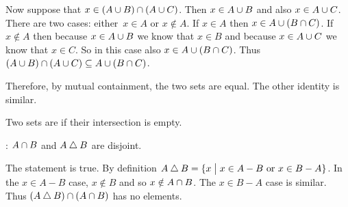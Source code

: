 \documentclass{ibl}  %
\begin{document}
\begin{problem}
\begin{exes}
\begin{answer}
  Now suppose that $x\in (A\cup B)\cap (A\cup C)$.
  Then $x\in A\cup B$ and also $x\in A\cup C$.
  There are two cases: either~$x\in A$ or $x\notin A$.
  If $x\in A$ then $x\in A\cup (B\cap C)$.
  If $x\notin A$ then because $x\in A\cup B$ we know that $x\in B$
  and because $x\in A\cup C$ we know that $x\in C$.
  So in this case also $x\in A\cup (B\cap C)$.
  Thus 
  $(A\cup B)\cap (A\cup C)\subseteq A\cup (B\cap C)$.

  Therefore, by mutual containment, the two sets are equal.
  The other identity is similar.  
\end{answer}
\end{exes}
\end{problem}

\begin{df}
Two sets are  if their intersection is empty.  
\end{df}

\begin{problem}[\midlength]
 \pord: $A\cap B$ and $A\mathbin{\triangle} B$ are disjoint.
\begin{answer}
  The statement is true.
  By definition $A\mathbin{\triangle} B=\{x \bigm| \text{$x\in A-B$ or $x\in B-A$}\}$.
  In the $x\in A-B$ case, $x\notin B$ and so $x\notin A\cap B$.
  The $x\in B-A$ case is similar.
  Thus $(A\mathbin{\triangle} B)\cap (A\cap B)$ has no elements.  
\end{answer}
\end{problem}
\end{document}

